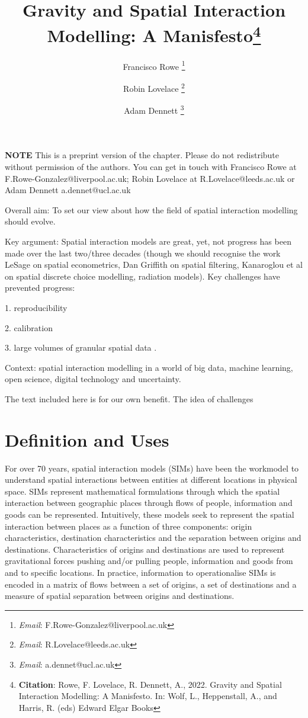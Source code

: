 \documentclass[11pt,letterpaper]{article}
\title{Gravity and Spatial Interaction Modelling: A Manisfesto\footnote{\textbf{Citation}: Rowe, F. Lovelace, R. Dennett, A., 2022. Gravity and Spatial Interaction Modelling: A Manisfesto. In: Wolf, L., Heppenstall, A., and Harris, R. (eds) Edward Elgar Books}}
\author[1]{Francisco Rowe \thanks{\textit{Email}: F.Rowe-Gonzalez@liverpool.ac.uk}}
\affil[1]{Geographic Data Science Lab, Department of Geography and Planning, University of Liverpool, Liverpool, United Kingdom}
\author[2]{Robin Lovelace \thanks{\textit{Email}: R.Lovelace@leeds.ac.uk}}
\affil[2]{Institute for Transport Studies, University of Leeds, Leeds, United Kingdom}
\author[3]{Adam Dennett \thanks{\textit{Email}: a.dennet@ucl.ac.uk}}
\affil[3]{The Bartlett Centre for Advanced Spatial Analytics, University College London, London, United Kingdom}
\date{}
\begin{document}
\maketitle


\textbf{NOTE} This is a preprint version of the chapter. Please do not redistribute without
permission of the authors. You can get in touch with Francisco Rowe at
F.Rowe-Gonzalez@liverpool.ac.uk; Robin Lovelace at R.Lovelace@leeds.ac.uk or Adam Dennett a.dennet@ucl.ac.uk

\begin{abstract}


\end{abstract}



\pagebreak

Overall aim: To set our view about how the field of spatial interaction modelling should evolve.

Key argument: Spatial interaction models are great, yet, not progress has been made over the last two/three decades (though we should recognise the work LeSage on spatial econometrics, Dan Griffith on spatial filtering, Kanaroglou et al on spatial discrete choice modelling, radiation models).
Key challenges have prevented progress:

1.
reproducibility

2.
calibration

3.
large volumes of granular spatial data .

Context: spatial interaction modelling in a world of big data, machine learning, open science, digital technology and uncertainty.

The text included here is for our own benefit.
The idea of challenges

\hypertarget{definition-and-uses}{%
\section{Definition and Uses}\label{definition-and-uses}}

For over 70 years, spatial interaction models (SIMs) have been the workmodel to understand spatial interactions between entities at different locations in physical space.
SIMs represent mathematical formulations through which the spatial interaction between geographic places through flows of people, information and goods can be represented.
Intuitively, these models seek to represent the spatial interaction between places as a function of three components: origin characteristics, destination characteristics and the separation between origins and destinations.
Characteristics of origins and destinations are used to represent gravitational forces pushing and/or pulling people, information and goods from and to specific locations.
In practice, information to operationalise SIMs is encoded in a matrix of flows between a set of origins, a set of destinations and a measure of spatial separation between origins and destinations.
\end{document}
